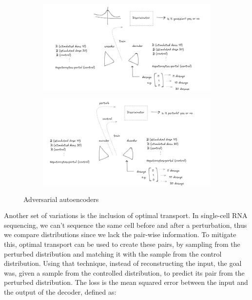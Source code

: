 \documentclass[12pt, a4paper]{article}
\begin{document}
\begin{figure}
    \centering
    \begin{subfigure}[t]{0.48\textwidth}
        \centering
        \includegraphics[width=\textwidth]{ae_gauss_sketch.png}
        \caption{}
        \label{}
    \end{subfigure}
    \hfill
    \begin{subfigure}[t]{0.48\textwidth}
        \centering
        \includegraphics[width=\textwidth]{ae_adv_sketch.png}
        \caption{}
        \label{}
    \end{subfigure}
    \caption{Adversarial autoencoders}
    \label{}
\end{figure}

Another set of variations is the inclusion of optimal transport. In single-cell RNA sequencing, we can't sequence the same cell before and after a perturbation, thus we compare distributions since we lack the pair-wise information. To mitigate this, optimal transport can be used to create these pairs, by sampling from the perturbed distribution and matching it with the sample from the control distribution. Using that technique, instead of reconstructing the input, the goal was, given a sample from the controlled distribution, to predict its pair from the perturbed distribution. The loss is the mean squared error between the input and the output of the decoder, defined as:
\end{document}
